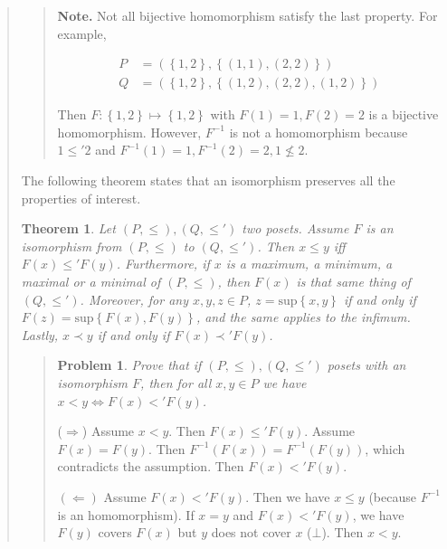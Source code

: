 \documentclass[a4paper, 12pt]{article}
\newtheorem{problem}{Problem}
\newtheorem{theorem}{Theorem}
\newtheorem{problem}{Problem}
\newtheorem{theorem}{Theorem}
\begin{document}
\begin{quote}
\small
\begin{quote}

\textbf{Note.} Not all bijective homomorphism satisfy the last property. For
example, 

\begin{align*}
    P &= \left( \left\{ 1, 2 \right\}, \left\{ (1, 1), (2, 2) \right\}\right) \\
    Q &= \left( \left\{ 1, 2 \right\}, \left\{ (1, 2),(2, 2), (1, 2)
\right\}   \right) 
\end{align*}

Then $F : \left\{ 1, 2 \right\} \mapsto \left\{ 1, 2
\right\} $ with $F(1) = 1, F(2) = 2$ is a bijective homomorphism. However,
$F^{-1}$ is not a homomorphism because $1 \leq' 2$ and $F^{-1}(1) = 1, F^{-1}(2)
= 2, 1 \not\leq 2$.

\end{quote}
\normalsize


The following theorem states that an isomorphism preserves all the properties of
interest.

\begin{theorem}
    Let $(P, \leq), (Q, \leq') $ two posets. Assume $F$ is an isomorphism from
    $(P, \leq) $ to $(Q, \leq') $. Then $x \leq y$ iff $F(x) \leq' F(y)$.
    Furthermore, if $x$ is a maximum, a minimum, a maximal or a minimal of $(P,
    \leq) $, then $F(x)$ is that same thing of $(Q, \leq') $. Moreover, for any
    $x, y, z \in P$, $z = \text{sup}\left\{ x, y \right\} $ if and only if $F(z)
    = \text{sup}\left\{ F(x), F(y) \right\} $, and the same applies to the
    infimum. Lastly, $x \prec y$ if and only if $F(x) \prec' F(y)$.
\end{theorem}


\small
\begin{quote}

\begin{problem}
    Prove that if $(P, \leq) , (Q, \leq') $ posets with an isomorphism $F$, then
    for all $x, y \in P$ we have $x < y \iff F(x) <' F(y)$.
\end{problem}

($\Rightarrow$) Assume $x < y$. Then $F(x) \leq' F(y)$. Assume $F(x) = F(y)$.
Then $F^{-1}(F(x)) = F^{-1}(F(y))$, which contradicts the assumption. Then $F(x) <'
F(y)$.

$(\Leftarrow)$ Assume $F(x) <' F(y)$. Then we have $x \leq y$ (because $F^{-1}$
is an homomorphism). If $x = y$ and $F(x) <' F(y)$, we have $F(y)$ covers $F(x)$
but $y$ does not cover $x$ ($\bot$). Then $x < y$.


\end{quote}
\end{quote}
\end{document}
